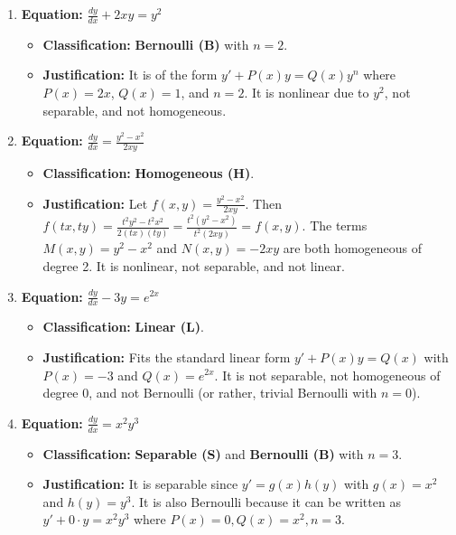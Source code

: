 \documentclass[11pt,letterpaper]{article}
\begin{document}
\begin{enumerate}[label=\textbf{\arabic*.}]
    \item \textbf{Equation:} $\frac{dy}{dx} + 2xy = y^2$
    \begin{itemize}
        \item \textbf{Classification:} \textbf{Bernoulli (B)} with $n = 2$.
        \item \textbf{Justification:} It is of the form $y' + P(x)y = Q(x)y^n$ where $P(x) = 2x$, $Q(x) = 1$, and $n = 2$. It is nonlinear due to $y^2$, not separable, and not homogeneous.
    \end{itemize}

    \item \textbf{Equation:} $\frac{dy}{dx} = \frac{y^2-x^2}{2xy}$
    \begin{itemize}
        \item \textbf{Classification:} \textbf{Homogeneous (H)}.
        \item \textbf{Justification:} Let $f(x,y) = \frac{y^2-x^2}{2xy}$. Then $f(tx,ty) = \frac{t^2 y^2 - t^2 x^2}{2(tx)(ty)} = \frac{t^2(y^2-x^2)}{t^2(2xy)} = f(x,y)$. The terms $M(x,y)=y^2-x^2$ and $N(x,y)=-2xy$ are both homogeneous of degree 2. It is nonlinear, not separable, and not linear.
    \end{itemize}

    \item \textbf{Equation:} $\frac{dy}{dx} - 3y = e^{2x}$
    \begin{itemize}
        \item \textbf{Classification:} \textbf{Linear (L)}.
        \item \textbf{Justification:} Fits the standard linear form $y' + P(x)y = Q(x)$ with $P(x) = -3$ and $Q(x) = e^{2x}$. It is not separable, not homogeneous of degree 0, and not Bernoulli (or rather, trivial Bernoulli with $n=0$).
    \end{itemize}

    \item \textbf{Equation:} $\frac{dy}{dx} = x^2 y^3$
    \begin{itemize}
        \item \textbf{Classification:} \textbf{Separable (S)} and \textbf{Bernoulli (B)} with $n=3$.
        \item \textbf{Justification:} It is separable since $y' = g(x)h(y)$ with $g(x)=x^2$ and $h(y)=y^3$. It is also Bernoulli because it can be written as $y' + 0 \cdot y = x^2 y^3$ where $P(x)=0, Q(x)=x^2, n=3$.
    \end{itemize}


\end{enumerate}
\end{document}
